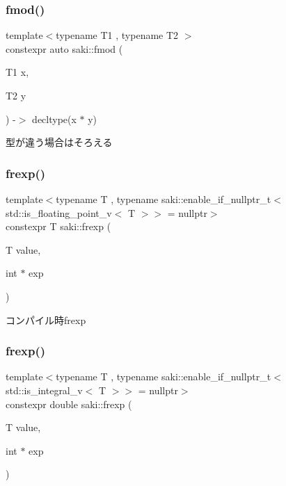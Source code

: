 \subsubsection{\texorpdfstring{fmod()}{fmod()}\hspace{0.1cm}{\footnotesize\ttfamily [2/2]}}
{\footnotesize\ttfamily template$<$typename T1 , typename T2 $>$ \\
constexpr auto saki\+::fmod (\begin{DoxyParamCaption}\item[{T1}]{x,  }\item[{T2}]{y }\end{DoxyParamCaption}) -\/$>$ decltype(x $\ast$ y)
	}



型が違う場合はそろえる 

\mbox{\label{namespacesaki_a00438d1cd099cfd0e2938f9e3defd283}} 
\subsubsection{\texorpdfstring{frexp()}{frexp()}\hspace{0.1cm}{\footnotesize\ttfamily [1/2]}}
{\footnotesize\ttfamily template$<$typename T , typename saki\+::enable\+\_\+if\+\_\+nullptr\+\_\+t$<$ std\+::is\+\_\+floating\+\_\+point\+\_\+v$<$ T $>$$>$  = nullptr$>$ \\
constexpr T saki\+::frexp (\begin{DoxyParamCaption}\item[{T}]{value,  }\item[{int $\ast$}]{exp }\end{DoxyParamCaption})}



コンパイル時frexp 

\mbox{\label{namespacesaki_a915bdd850c89e1ed06c5087790109f11}} 
\subsubsection{\texorpdfstring{frexp()}{frexp()}\hspace{0.1cm}{\footnotesize\ttfamily [2/2]}}
{\footnotesize\ttfamily template$<$typename T , typename saki\+::enable\+\_\+if\+\_\+nullptr\+\_\+t$<$ std\+::is\+\_\+integral\+\_\+v$<$ T $>$$>$  = nullptr$>$ \\
constexpr double saki\+::frexp (\begin{DoxyParamCaption}\item[{T}]{value,  }\item[{int $\ast$}]{exp }\end{DoxyParamCaption})}




